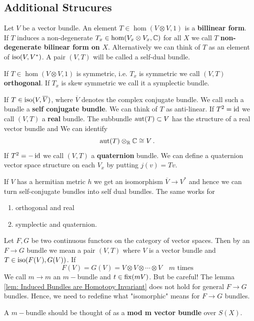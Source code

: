 \subsection{Additional Strucures}
\begin{definition}
	Let $V$ be a vector bundle. An element $T\in \hom(V\otimes V,1)$ is a \textbf{billinear form}. 
	If $T$ induces a non-degenerate $T_x\in \hom(V_x\otimes V_x,\mathbb{C})$ for all $X$ we call $T$ \textbf{non-degenerate bilinear form on $X$}. Alternatively we can think of $T$ as an element of $\mathrm{iso}(V,V^*)$. A pair $(V,T)$ will be called a self-dual bundle.
\end{definition}
\begin{definition}
	If $T\in \hom(V\otimes V,1)$ is symmetric, i.e. $T_x$ is symmetric we call $(V,T)$ \textbf{orthogonal}. If $T_x$ is skew symmetric we call it a symplectic bundle.
\end{definition}
\begin{definition}
	If $T\in \mathrm{iso}(V,\overline{V})$, where $\overline{V}$ denotes the complex conjugate bundle. We call such a bundle a \textbf{self conjugate bundle}. We can think of $T$ as anti-linear. If $T^2= \operatorname{\mathrm{id}}$ we call $(V,T)$ a \textbf{real} bundle. The subbundle  $\operatorname{\mathrm{aut}}(T)\subset V$ has the structure of a real vector bundle and We can identify 
	\begin{equation*}
		\operatorname{\mathrm{aut}}(T)\otimes_{\mathbb{R}} \mathbb{C} \cong V\, .
	\end{equation*} If $T^2=-\operatorname{\mathrm{id}}$ we call $(V,T)$ a \textbf{quaternion} bundle. We can define a quaternion vector space structure on each $V_x$ by putting $j(v)=Tv$. 
\end{definition}
\begin{lemma}
	If $V$ has a hermitian metric $h$ we get an isomorphism $\overline{V}\to V^*$ and hence we can turn self-conjugate bundles into self dual bundles. The same works for 
	\begin{enumerate}
		\item orthogonal and real
		\item symplectic and quaternion.
	\end{enumerate}
\end{lemma}
\begin{definition}
	Let $F,G$ be two continuous functors on the category of vector spaces. Then by an $F\to G$ bundle we mean a pair $(V,T)$ where $V$ is a vector bundle and $T\in \mathrm{iso}(F(V),G(V))$.
	If 
	\begin{equation*}
		F(V)=G(V)=V\otimes V\otimes \cdots \otimes V \quad \text{$m$ times}
	\end{equation*}
	We call $m\to m$ an $m-$bundle and $t\in \operatorname{\mathrm{fix}}(mV)$. But be careful! The lemma \ref{lem: Induced Bundles are Homotopy Invariant} does not hold for general $F\to G$ bundles. Hence, we need to redefine what 
	"isomorphic"  means for $F\to G$ bundles.
\end{definition}
\begin{remark}
	A $m-$bundle should be thought of as a \textbf{mod m vector bundle} over $S(X)$. 
\end{remark}
